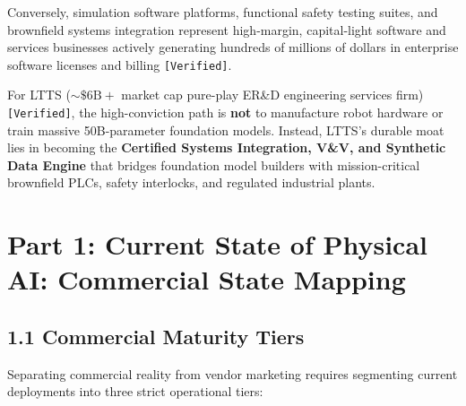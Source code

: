 \documentclass[11pt,a4paper]{article}
\begin{document}
Conversely, simulation software platforms, functional safety testing suites, and brownfield systems integration represent high-margin, capital-light software and services businesses actively generating hundreds of millions of dollars in enterprise software licenses and billing \texttt{[Verified]}. 

For LTTS ($\sim\$6\text{B}+$ market cap pure-play ER\&D engineering services firm) \texttt{[Verified]}, the high-conviction path is \textbf{not} to manufacture robot hardware or train massive 50B-parameter foundation models. Instead, LTTS's durable moat lies in becoming the \textbf{Certified Systems Integration, V\&V, and Synthetic Data Engine} that bridges foundation model builders with mission-critical brownfield PLCs, safety interlocks, and regulated industrial plants.

\section{Part 1: Current State of Physical AI: Commercial State Mapping}

\subsection{1.1 Commercial Maturity Tiers}
Separating commercial reality from vendor marketing requires segmenting current deployments into three strict operational tiers:
\end{document}
